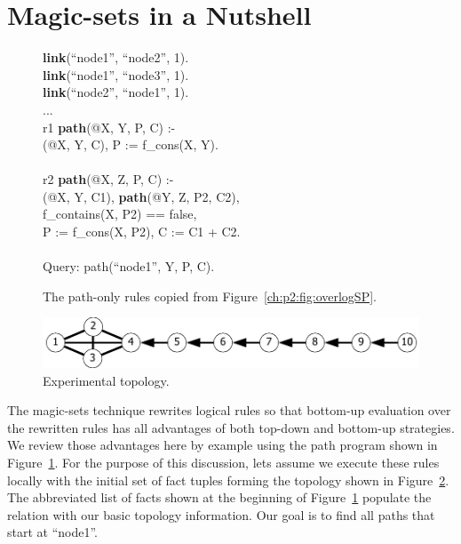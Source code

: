 \section{Magic-sets in a Nutshell}
\label{ch:magic:sec:review}

\begin{figure}[!t]
\ssp
\centering
\begin{boxedminipage}{\linewidth}
{\bf link}(``node1'', ``node2'', 1).\\
{\bf link}(``node1'', ``node3'', 1).\\
{\bf link}(``node2'', ``node1'', 1).\\
...\\
r1 {\bf path}(@X, Y, P, C) :- \\
(@X, Y, C), P := f\_cons(X, Y). \\
\\
r2 {\bf path}(@X, Z, P, C) :- \\
(@X, Y, C1), {\bf path}(@Y, Z, P2, C2),\\
\datalogspace f\_contains(X, P2) == false, \\
\datalogspace P := f\_cons(X, P2), C := C1 + C2. \\
\\
Query: path(``node1'', Y, P, C).
\end{boxedminipage}
\caption{\label{ch:magic:fig:basicSP}The path-only rules copied from Figure~\ref{ch:p2:fig:overlogSP}.}
\end{figure}

\begin{figure}
\centering
\includegraphics[scale=1.2]{figures/Topology}
\caption{Experimental topology.}
\label{ch:magic:fig:topo}
\end{figure}

The magic-sets technique rewrites logical rules so that bottom-up evaluation
over the rewritten rules has all advantages of both top-down and bottom-up
strategies.  We review those advantages here by example using the path program
shown in Figure~\ref{ch:magic:fig:basicSP}.  For the purpose of this
discussion, lets assume we execute these rules locally with the initial set of
 fact tuples forming the topology shown in
Figure~\ref{ch:magic:fig:topo}.  The abbreviated list of facts shown at the
beginning of Figure~\ref{ch:magic:fig:basicSP} populate the  relation
with our basic topology information.  Our goal is to find all paths that start
at ``node1''.

